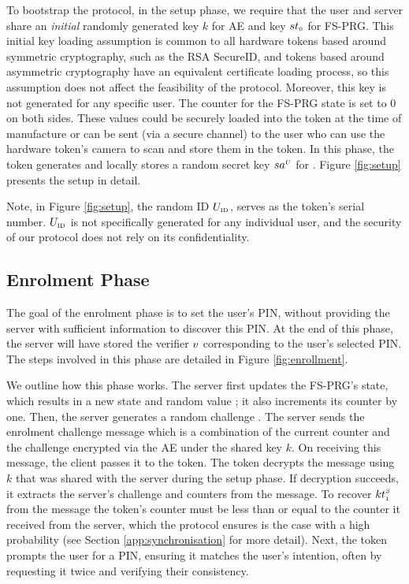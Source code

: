 To bootstrap the protocol, in the setup phase, we require that the user
and server share an \emph{initial} randomly generated key $k$ for AE and key ${st}_{\scriptscriptstyle 0}$ for  FS-PRG.
This initial key loading assumption is common to all hardware tokens based around symmetric cryptography, such as the RSA SecureID, and tokens based around asymmetric cryptography have an equivalent certificate loading process, so this assumption does not affect the feasibility of the protocol. Moreover, this key is not generated for any specific user. 
The counter for the FS-PRG state is set to $0$ on both sides. 
These values could be securely loaded into the token at the time of
manufacture or can be sent (via a secure channel) to the user who can use the hardware token's camera to scan and store them in the token.
In this phase, the token generates and locally stores a random secret key ${sa}^{\scriptscriptstyle U}$ for \prf.  Figure \ref{fig:setup} presents the setup in detail. 




Note, in Figure \ref{fig:setup}, the random ID $U_{\scriptscriptstyle \mathrm{ID}}$, serves as the token's serial number. $U_{\scriptscriptstyle \mathrm{ID}}$ is not specifically generated for any individual user, and the security of our protocol does not rely on its confidentiality. 

\subsection{Enrolment Phase}
\label{sec:enrollment}

The goal of the enrolment phase is to set the user's PIN, without providing the  
 server with sufficient information to discover this PIN. 
% 
  At the end of this phase, the server will have stored the verifier ${v}$ corresponding to the user's selected PIN.
The steps involved in this phase are detailed in Figure \ref{fig:enrollment}.  







We outline how this phase works.  The server first updates the FS-PRG's state, which results in a new state and random value ; it also increments its counter by one. Then, the server generates a random challenge \VS{\nonce}. The server sends the enrolment challenge message which is a combination of the current counter and the challenge encrypted via the AE under the shared key $k$.
%
 On receiving this message, the client passes it to the token. The token decrypts the message using $k$ that was shared with the server during the setup phase.  If decryption succeeds, it extracts the server's challenge and counters from the message. To recover ${kt}_{\scriptscriptstyle 1}^{\scriptscriptstyle S}$ from the message the token's counter must be less than or equal to the counter it received from the server, which the protocol ensures is the case with a high probability (see Section \ref{app:synchronisation} for more detail). Next, the token prompts the user for a PIN, ensuring it matches the user's intention, often by requesting it twice and verifying their consistency.
 


